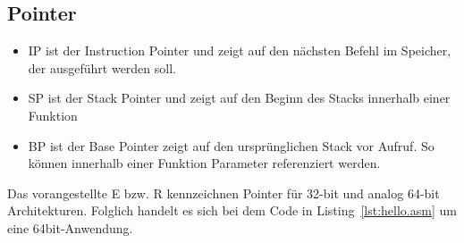 \subsection{Pointer}
\begin{itemize}
    \item IP ist der Instruction Pointer und zeigt auf den nächsten Befehl im
        Speicher, der ausgeführt werden soll.
    \item SP ist der Stack Pointer und zeigt auf den Beginn des Stacks innerhalb
        einer Funktion
    \item BP ist der Base Pointer zeigt auf den ursprünglichen Stack vor Aufruf.
        So können innerhalb einer Funktion Parameter referenziert werden.
\end{itemize}
Das vorangestellte E bzw. R kennzeichnen Pointer für 32-bit und analog
64-bit Architekturen. Folglich handelt es sich bei dem Code in
Listing~\ref{lst:hello.asm} um eine 64bit-Anwendung.




